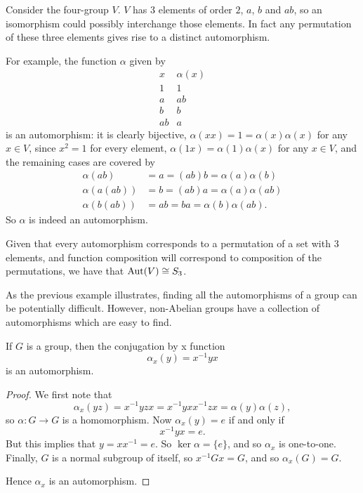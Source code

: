 \begin{example}
  Consider the four-group $V$.  $V$ has $3$ elements of order $2$, $a$, $b$
  and $ab$, so an isomorphism could possibly interchange those elements.
  In fact any permutation of these three elements gives rise to a distinct
  automorphism.
  
  For example, the function $\alpha$ given by
  \[
    \begin{array}{c|c}
      x & \alpha(x) \\
      \hline
      1 & 1\\
      a & ab\\
      b & b\\
      ab & a
    \end{array}
  \]
  is an automorphism: it is clearly bijective, $\alpha(xx) = 1 =
  \alpha(x)\alpha(x)$ for any $x \in V$, since $x^{2} = 1$ for every element,
  $\alpha(1x) = \alpha(1)\alpha(x)$ for any $x \in V$, and the remaining cases
  are covered by
  \begin{align*}
      \alpha(a b) &= a = (ab)b = \alpha(a)\alpha(b)\\
      \alpha(a (ab)) &= b = (ab)a = \alpha(a)\alpha(ab)\\
      \alpha(b (ab)) &= ab = ba = \alpha(b)\alpha(ab).
  \end{align*}
  So $\alpha$ is indeed an automorphism.
  
  Given that every automorphism corresponds to a permutation of a set with
  3 elements, and function composition will correspond to composition of the
  permutations, we have that $\operatorname{Aut}(V) \cong S_{3}$.
\end{example}

As the previous example illustrates, finding all the automorphisms of a group
can be potentially difficult.  However, non-Abelian groups have a collection of
automorphisms which are easy to find.

\begin{proposition}
  If $G$ is a group, then the conjugation by x function
  \[
    \alpha_{x}(y) = x^{-1}yx
  \]
  is an automorphism.
\end{proposition}
\begin{proof}
  We first note that
  \[
    \alpha_{x}(yz) = x^{-1}yzx = x^{-1}yxx^{-1}zx = \alpha(y)\alpha(z),
  \]
  so $\alpha: G \to G$ is a homomorphism.  Now $\alpha_{x}(y) = e$ if and only if
  \[
    x^{-1}yx = e.
  \]
  But this implies that $y = xx^{-1} = e$.  So $\ker \alpha = \{e\}$, and
  so $\alpha_{x}$ is one-to-one.  Finally, $G$ is a normal subgroup of itself,
  so $x^{-1}Gx = G$, and so $\alpha_{x}(G) = G$.
  
  Hence $\alpha_{x}$ is an automorphism.
\end{proof}

